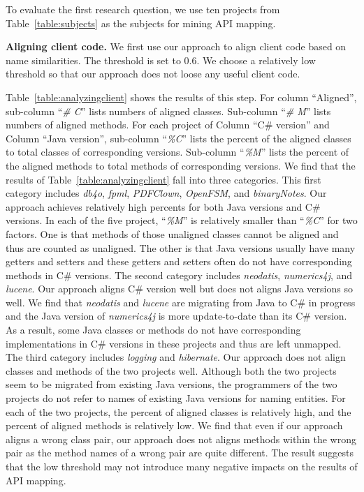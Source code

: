 To evaluate the first research question, we use ten projects from
Table~\ref{table:subjects} as the subjects for mining API mapping.


\textbf{Aligning client code.} We first use our approach to align
client code based on name similarities. The threshold is set to 0.6.
We choose a relatively low threshold so that our approach does not
loose any useful client code.

Table~\ref{table:analyzingclient} shows the results of this step.
For column ``Aligned'', sub-column ``\emph{\# C}'' lists numbers of
aligned classes. Sub-column ``\emph{\# M}'' lists numbers of aligned
methods. For each project of Column ``C\# version'' and Column
``Java version'', sub-column ``\emph{\%C}'' lists the percent of the
aligned classes to total classes of corresponding versions.
Sub-column ``\emph{\%M}'' lists the percent of the aligned methods
to total methods of corresponding versions. We find that the results
of Table~\ref{table:analyzingclient} fall into three categories.
This first category includes \emph{db4o}, \emph{fpml},
\emph{PDFClown}, \emph{OpenFSM}, and \emph{binaryNotes}. Our
approach achieves relatively high percents for both Java versions
and C\# versions. In each of the five project, ``\emph{\%M}'' is
relatively smaller than ``\emph{\%C}'' for two factors. One is that
methods of those unaligned classes cannot be aligned and thus are
counted as unaligned. The other is that Java versions usually have
many getters and setters and these getters and setters often do not
have corresponding methods in C\# versions. The second category
includes \emph{neodatis}, \emph{numerics4j}, and \emph{lucene}. Our
approach aligns C\# version well but does not aligns Java versions
so well. We find that \emph{neodatis} and \emph{lucene} are
migrating from Java to C\# in progress and the Java version of
\emph{numerics4j} is more update-to-date than its C\# version. As a
result, some Java classes or methods do not have corresponding
implementations in C\# versions in these projects and thus are left
unmapped. The third category includes \emph{logging} and
\emph{hibernate}. Our approach does not align classes and methods of
the two projects well. Although both the two projects seem to be
migrated from existing Java versions, the programmers of the two
projects do not refer to names of existing Java versions for naming
entities. For each of the two projects, the percent of aligned
classes is relatively high, and the percent of aligned methods is
relatively low. We find that even if our approach aligns a wrong
class pair, our approach does not aligns methods within the wrong
pair as the method names of a wrong pair are quite different. The
result suggests that the low threshold may not introduce many
negative impacts on the results of API mapping.

